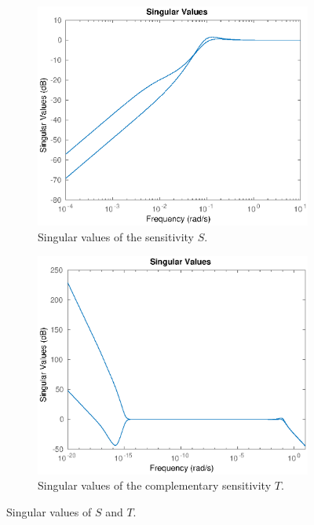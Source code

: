 \documentclass[11pt,a4paper]{article}
\begin{document}
\begin{figure}[!ht]
	\footnotesize
	\centering 
	\begin{subfigure}[t]{.495\linewidth}
		\includegraphics[width=\columnwidth]{322}
		\caption{Singular values of the sensitivity $S$.}
		\label{fig:322}
	\end{subfigure}
	\begin{subfigure}[t]{.495\linewidth}
		\includegraphics[width=\columnwidth]{3222}
		\caption{Singular values of the complementary sensitivity $T$.}
		\label{fig:3222}
	\end{subfigure}
	\caption{Singular values of $S$ and $T$.}
	\label{fig:MPSingular}
\end{figure}
\end{document}
